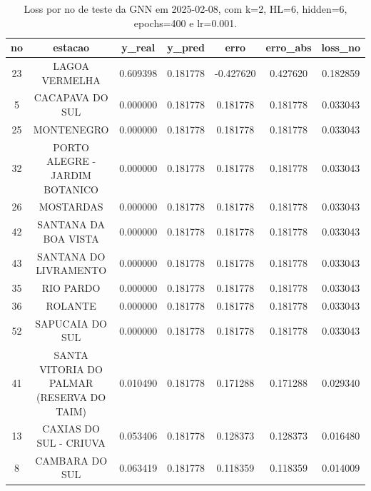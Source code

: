 \begin{table}[h]
\centering
\caption{Loss por no de teste da GNN em 2025-02-08, com k=2, HL=6, hidden=6, epochs=400 e lr=0.001.}
\label{tab:gnn_loss_k2_hl6_h6_e400_d20250208}
\begin{tabular}{ccccccc}
\toprule
no & estacao & y\_real & y\_pred & erro & erro\_abs & loss\_no \\
\midrule
23 & LAGOA VERMELHA & 0.609398 & 0.181778 & -0.427620 & 0.427620 & 0.182859 \\
5 & CACAPAVA DO SUL & 0.000000 & 0.181778 & 0.181778 & 0.181778 & 0.033043 \\
25 & MONTENEGRO & 0.000000 & 0.181778 & 0.181778 & 0.181778 & 0.033043 \\
32 & PORTO ALEGRE - JARDIM BOTANICO & 0.000000 & 0.181778 & 0.181778 & 0.181778 & 0.033043 \\
26 & MOSTARDAS & 0.000000 & 0.181778 & 0.181778 & 0.181778 & 0.033043 \\
42 & SANTANA DA BOA VISTA & 0.000000 & 0.181778 & 0.181778 & 0.181778 & 0.033043 \\
43 & SANTANA DO LIVRAMENTO & 0.000000 & 0.181778 & 0.181778 & 0.181778 & 0.033043 \\
35 & RIO PARDO & 0.000000 & 0.181778 & 0.181778 & 0.181778 & 0.033043 \\
36 & ROLANTE & 0.000000 & 0.181778 & 0.181778 & 0.181778 & 0.033043 \\
52 & SAPUCAIA DO SUL & 0.000000 & 0.181778 & 0.181778 & 0.181778 & 0.033043 \\
41 & SANTA VITORIA DO PALMAR (RESERVA DO TAIM) & 0.010490 & 0.181778 & 0.171288 & 0.171288 & 0.029340 \\
13 & CAXIAS DO SUL - CRIUVA & 0.053406 & 0.181778 & 0.128373 & 0.128373 & 0.016480 \\
8 & CAMBARA DO SUL & 0.063419 & 0.181778 & 0.118359 & 0.118359 & 0.014009 \\
\bottomrule
\end{tabular}
\end{table}
